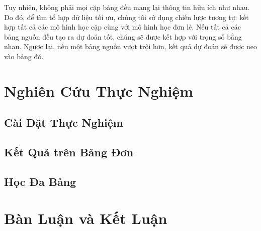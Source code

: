 \documentclass{article}
\begin{document}
Tuy nhiên, không phải mọi cặp bảng đều mang lại thông tin hữu ích như nhau. Do đó, để tìm tổ hợp dữ liệu tối ưu, chúng tôi sử dụng chiến lược tương tự: kết hợp tất cả các mô hình học cặp cùng với mô hình học đơn lẻ. Nếu tất cả các bảng nguồn đều tạo ra dự đoán tốt, chúng sẽ được kết hợp với trọng số bằng nhau. Ngược lại, nếu một bảng nguồn vượt trội hơn, kết quả dự đoán sẽ được neo vào bảng đó.


\section{Nghiên Cứu Thực Nghiệm}
\subsection{Cài Đặt Thực Nghiệm}

\subsection{Kết Quả trên Bảng Đơn}

\subsection{Học Đa Bảng}

\section{Bàn Luận và Kết Luận}

\end{document}
